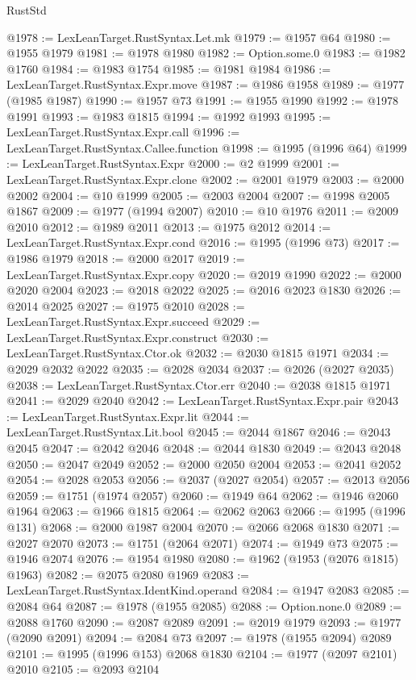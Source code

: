 \begin{lexlean}{RustStd}
\begin{coremodule}
@1978 := LexLeanTarget.RustSyntax.Let.mk
@1979 := @1957 @64
@1980 := @1955 @1979
@1981 := @1978 @1980
@1982 := Option.some.{0}
@1983 := @1982 @1760
@1984 := @1983 @1754
@1985 := @1981 @1984
@1986 := LexLeanTarget.RustSyntax.Expr.move
@1987 := @1986 @1958
@1989 := @1977 (@1985 @1987)
@1990 := @1957 @73
@1991 := @1955 @1990
@1992 := @1978 @1991
@1993 := @1983 @1815
@1994 := @1992 @1993
@1995 := LexLeanTarget.RustSyntax.Expr.call
@1996 := LexLeanTarget.RustSyntax.Callee.function
@1998 := @1995 (@1996 @64)
@1999 := LexLeanTarget.RustSyntax.Expr
@2000 := @2 @1999
@2001 := LexLeanTarget.RustSyntax.Expr.clone
@2002 := @2001 @1979
@2003 := @2000 @2002
@2004 := @10 @1999
@2005 := @2003 @2004
@2007 := @1998 @2005 @1867
@2009 := @1977 (@1994 @2007)
@2010 := @10 @1976
@2011 := @2009 @2010
@2012 := @1989 @2011
@2013 := @1975 @2012
@2014 := LexLeanTarget.RustSyntax.Expr.cond
@2016 := @1995 (@1996 @73)
@2017 := @1986 @1979
@2018 := @2000 @2017
@2019 := LexLeanTarget.RustSyntax.Expr.copy
@2020 := @2019 @1990
@2022 := @2000 @2020 @2004
@2023 := @2018 @2022
@2025 := @2016 @2023 @1830
@2026 := @2014 @2025
@2027 := @1975 @2010
@2028 := LexLeanTarget.RustSyntax.Expr.succeed
@2029 := LexLeanTarget.RustSyntax.Expr.construct
@2030 := LexLeanTarget.RustSyntax.Ctor.ok
@2032 := @2030 @1815 @1971
@2034 := @2029 @2032 @2022
@2035 := @2028 @2034
@2037 := @2026 (@2027 @2035)
@2038 := LexLeanTarget.RustSyntax.Ctor.err
@2040 := @2038 @1815 @1971
@2041 := @2029 @2040
@2042 := LexLeanTarget.RustSyntax.Expr.pair
@2043 := LexLeanTarget.RustSyntax.Expr.lit
@2044 := LexLeanTarget.RustSyntax.Lit.bool
@2045 := @2044 @1867
@2046 := @2043 @2045
@2047 := @2042 @2046
@2048 := @2044 @1830
@2049 := @2043 @2048
@2050 := @2047 @2049
@2052 := @2000 @2050 @2004
@2053 := @2041 @2052
@2054 := @2028 @2053
@2056 := @2037 (@2027 @2054)
@2057 := @2013 @2056
@2059 := @1751 (@1974 @2057)
@2060 := @1949 @64
@2062 := @1946 @2060 @1964
@2063 := @1966 @1815
@2064 := @2062 @2063
@2066 := @1995 (@1996 @131)
@2068 := @2000 @1987 @2004
@2070 := @2066 @2068 @1830
@2071 := @2027 @2070
@2073 := @1751 (@2064 @2071)
@2074 := @1949 @73
@2075 := @1946 @2074
@2076 := @1954 @1980
@2080 := @1962 (@1953 (@2076 @1815) @1963)
@2082 := @2075 @2080 @1969
@2083 := LexLeanTarget.RustSyntax.IdentKind.operand
@2084 := @1947 @2083
@2085 := @2084 @64
@2087 := @1978 (@1955 @2085)
@2088 := Option.none.{0}
@2089 := @2088 @1760
@2090 := @2087 @2089
@2091 := @2019 @1979
@2093 := @1977 (@2090 @2091)
@2094 := @2084 @73
@2097 := @1978 (@1955 @2094) @2089
@2101 := @1995 (@1996 @153) @2068 @1830
@2104 := @1977 (@2097 @2101) @2010
@2105 := @2093 @2104

\end{coremodule}
\end{lexlean}
